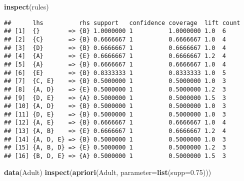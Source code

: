 \documentclass[
]{article}
\newenvironment{Shaded}{\begin{snugshade}}{\end{snugshade}}
\newcommand{\AttributeTok}[1]{\textcolor[rgb]{0.13,0.29,0.53}{#1}}
\newcommand{\FloatTok}[1]{\textcolor[rgb]{0.00,0.00,0.81}{#1}}
\newcommand{\FunctionTok}[1]{\textcolor[rgb]{0.13,0.29,0.53}{\textbf{#1}}}
\newcommand{\NormalTok}[1]{#1}
\begin{document}
\begin{Shaded}
\begin{Highlighting}[]
\FunctionTok{inspect}\NormalTok{(rules)}
\end{Highlighting}
\end{Shaded}

\begin{verbatim}
##      lhs          rhs support   confidence coverage  lift count
## [1]  {}        => {B} 1.0000000 1          1.0000000 1.0  6    
## [2]  {C}       => {B} 0.6666667 1          0.6666667 1.0  4    
## [3]  {D}       => {B} 0.6666667 1          0.6666667 1.0  4    
## [4]  {A}       => {E} 0.6666667 1          0.6666667 1.2  4    
## [5]  {A}       => {B} 0.6666667 1          0.6666667 1.0  4    
## [6]  {E}       => {B} 0.8333333 1          0.8333333 1.0  5    
## [7]  {C, E}    => {B} 0.5000000 1          0.5000000 1.0  3    
## [8]  {A, D}    => {E} 0.5000000 1          0.5000000 1.2  3    
## [9]  {D, E}    => {A} 0.5000000 1          0.5000000 1.5  3    
## [10] {A, D}    => {B} 0.5000000 1          0.5000000 1.0  3    
## [11] {D, E}    => {B} 0.5000000 1          0.5000000 1.0  3    
## [12] {A, E}    => {B} 0.6666667 1          0.6666667 1.0  4    
## [13] {A, B}    => {E} 0.6666667 1          0.6666667 1.2  4    
## [14] {A, D, E} => {B} 0.5000000 1          0.5000000 1.0  3    
## [15] {A, B, D} => {E} 0.5000000 1          0.5000000 1.2  3    
## [16] {B, D, E} => {A} 0.5000000 1          0.5000000 1.5  3
\end{verbatim}

\begin{Shaded}
\begin{Highlighting}[]
\FunctionTok{data}\NormalTok{(Adult)}
\FunctionTok{inspect}\NormalTok{(}\FunctionTok{apriori}\NormalTok{(Adult, }\AttributeTok{parameter=}\FunctionTok{list}\NormalTok{(}\AttributeTok{supp=}\FloatTok{0.75}\NormalTok{)))}
\end{Highlighting}
\end{Shaded}
\end{document}
